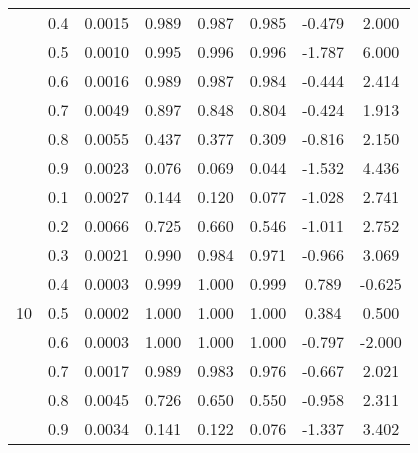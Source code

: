 \documentclass[11pt,a4paper]{report}
\begin{document}
\begin{longtable}{ | c | c || c | c | c | c | c | c | }
 & 0.4 & 0.0015 & 0.989 & 0.987 & 0.985 & -0.479 & 2.000 \\
 & 0.5 & 0.0010 & 0.995 & 0.996 & 0.996 & -1.787 & 6.000 \\
 & 0.6 & 0.0016 & 0.989 & 0.987 & 0.984 & -0.444 & 2.414 \\
 & 0.7 & 0.0049 & 0.897 & 0.848 & 0.804 & -0.424 & 1.913 \\
 & 0.8 & 0.0055 & 0.437 & 0.377 & 0.309 & -0.816 & 2.150 \\
 & 0.9 & 0.0023 & 0.076 & 0.069 & 0.044 & -1.532 & 4.436 \\
 \hline
\multirow{9}{*}{10} & 0.1 & 0.0027 & 0.144 & 0.120 & 0.077 & -1.028 & 2.741 \\
 & 0.2 & 0.0066 & 0.725 & 0.660 & 0.546 & -1.011 & 2.752 \\
 & 0.3 & 0.0021 & 0.990 & 0.984 & 0.971 & -0.966 & 3.069 \\
 & 0.4 & 0.0003 & 0.999 & 1.000 & 0.999 & 0.789 & -0.625 \\
 & 0.5 & 0.0002 & 1.000 & 1.000 & 1.000 & 0.384 & 0.500 \\
 & 0.6 & 0.0003 & 1.000 & 1.000 & 1.000 & -0.797 & -2.000 \\
 & 0.7 & 0.0017 & 0.989 & 0.983 & 0.976 & -0.667 & 2.021 \\
 & 0.8 & 0.0045 & 0.726 & 0.650 & 0.550 & -0.958 & 2.311 \\
 & 0.9 & 0.0034 & 0.141 & 0.122 & 0.076 & -1.337 & 3.402 \\
 \hline
\hline
\end{longtable}
\end{document}
